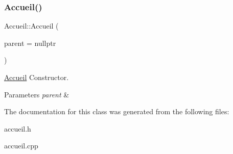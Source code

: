 \subsubsection{\texorpdfstring{Accueil()}{Accueil()}}
{\footnotesize\ttfamily Accueil\+::\+Accueil (\begin{DoxyParamCaption}\item[{Q\+Widget $\ast$}]{parent = {\ttfamily nullptr} }\end{DoxyParamCaption})\hspace{0.3cm}{\ttfamily [explicit]}}



\mbox{\hyperlink{class_accueil}{Accueil}} Constructor. 


\begin{DoxyParams}{Parameters}
{\em parent} & \\
\hline
\end{DoxyParams}


The documentation for this class was generated from the following files\+:\begin{DoxyCompactItemize}
\item 
accueil.\+h\item 
accueil.\+cpp\end{DoxyCompactItemize}
